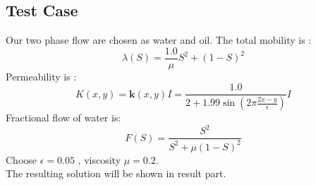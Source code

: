 \documentclass[12pt]{article}
\begin{document}
\subsection{Test Case}
Our two phase flow are chosen as water and oil. The total mobility
is : $$\lambda (S) = \frac{1.0}{\mu} S^2 +(1-S)^2$$ Permeability is
:
$$K(x,y)=\mathbf{k}(x,y)I=\frac{1.0}{2+1.99\sin(2\pi\frac{2x-y}{\epsilon})}
I$$
 Fractional flow of water is: $$F(S)=\frac{S^2}{S^2+\mu (1-S)^2}$$
Choose $\epsilon=0.05$ , viscosity $\mu=0.2$. \\
The resulting solution will be shown in result part.
\end{document}
